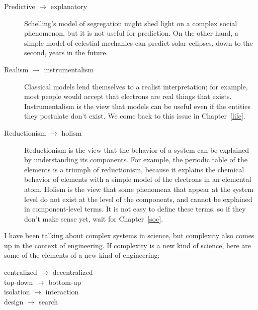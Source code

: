 \documentclass[10pt]{book}
\begin{document}
\begin{description}

\item[Predictive $\rightarrow$ explanatory] Schelling's model
of segregation might shed light on a complex social phenomenon, but
it is not useful for prediction.  On the other hand, a simple model
of celestial mechanics can predict solar eclipses, down to the second,
years in the future.

\item[Realism $\rightarrow$ instrumentalism] Classical models lend
themselves to a realist interpretation; for example, most people
would accept that electrons are real things that exists.  Instrumentalism
is the view that models can be useful even if the entities they
postulate don't exist.  We come back to this issue in Chapter~\ref{life}.

\item[Reductionism $\rightarrow$ holism] Reductionism is the view
that the behavior of a system can be explained by understanding
its components.  For example, the periodic table of the elements is
a triumph of reductionism, because it explains 
the chemical behavior of elements with a simple model of
the electrons in an elemental atom.  Holism is the view that
some phenomena that appear at the system level do not exist at the
level of the components, and cannot be explained in component-level
terms.  It is not easy to define these terms, so if they don't
make sense yet, wait for Chapter~\ref{soc}.

\end{description}

I have been talking about complex systems in science, but complexity
also comes up in the context of engineering.  If complexity is a new
kind of science, here are some of the elements of a new kind of
engineering:

\begin{description}

\item[centralized $\rightarrow$ decentralized] 

\item[top-down $\rightarrow$ bottom-up]

\item[isolation $\rightarrow$ interaction] 

\item[design $\rightarrow$ search] 

\end{description}
\end{document}
